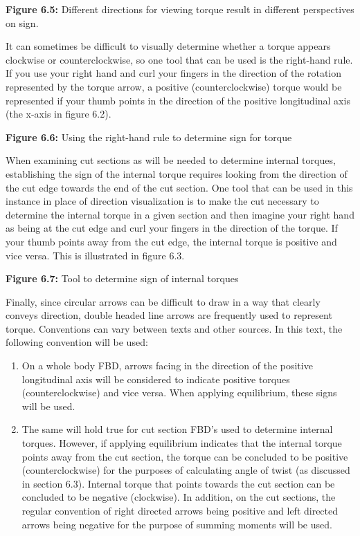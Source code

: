 \documentclass[
  letterpaper,
  DIV=11,
  numbers=noendperiod]{scrreprt}
\providecommand{\tightlist}{%
  \setlength{\itemsep}{0pt}\setlength{\parskip}{0pt}}\usepackage{longtable,booktabs,array}
\begin{document}
\textbf{Figure 6.5:} Different directions for viewing torque result in
different perspectives on sign.

It can sometimes be difficult to visually determine whether a torque
appears clockwise or counterclockwise, so one tool that can be used is
the right-hand rule. If you use your right hand and curl your fingers in
the direction of the rotation represented by the torque arrow, a
positive (counterclockwise) torque would be represented if your thumb
points in the direction of the positive longitudinal axis (the x-axis in
figure 6.2).

\textbf{Figure 6.6:} Using the right-hand rule to determine sign for
torque

When examining cut sections as will be needed to determine internal
torques, establishing the sign of the internal torque requires looking
from the direction of the cut edge towards the end of the cut section.
One tool that can be used in this instance in place of direction
visualization is to make the cut necessary to determine the internal
torque in a given section and then imagine your right hand as being at
the cut edge and curl your fingers in the direction of the torque. If
your thumb points away from the cut edge, the internal torque is
positive and vice versa. This is illustrated in figure 6.3.

\textbf{Figure 6.7:} Tool to determine sign of internal torques

Finally, since circular arrows can be difficult to draw in a way that
clearly conveys direction, double headed line arrows are frequently used
to represent torque. Conventions can vary between texts and other
sources. In this text, the following convention will be used:

\begin{enumerate}
\def\labelenumi{\arabic{enumi}.}
\tightlist
\item
  On a whole body FBD, arrows facing in the direction of the positive
  longitudinal axis will be considered to indicate positive torques
  (counterclockwise) and vice versa. When applying equilibrium, these
  signs will be used.
\item
  The same will hold true for cut section FBD's used to determine
  internal torques. However, if applying equilibrium indicates that the
  internal torque points away from the cut section, the torque can be
  concluded to be positive (counterclockwise) for the purposes of
  calculating angle of twist (as discussed in section 6.3). Internal
  torque that points towards the cut section can be concluded to be
  negative (clockwise). In addition, on the cut sections, the regular
  convention of right directed arrows being positive and left directed
  arrows being negative for the purpose of summing moments will be used.
\end{enumerate}
\end{document}
